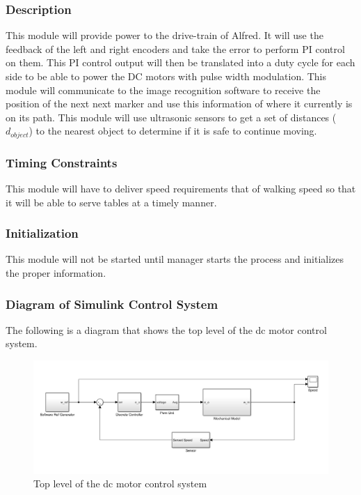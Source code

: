 \documentclass [10pt]{article}
\begin{document}

\subsubsection{Description}
This module will provide power to the drive-train of Alfred. It will use the feedback of the left and right encoders and take the error to perform PI control on them. This PI control output will then be translated into a duty cycle for each side to be able to power the DC motors with pulse width modulation. This module will communicate to the image recognition software to receive the position of the next next marker and use this information of where it currently is on its path. This module will use ultrasonic sensors to get a set of distances ($ d_{object} $) to the nearest object to determine if it is safe to continue moving.


\subsubsection{Timing Constraints}
This module will have to deliver speed requirements that of walking speed so that it will be able to serve tables at a timely manner.


\subsubsection{Initialization}
This module will not be started until manager starts the process and initializes the proper information.


\subsubsection{Diagram of Simulink Control System}
The following is a diagram that shows the top level of the dc motor control system. 
\begin{figure} [h!]
	\centering
	\includegraphics [scale = 0.4] {Figures/Simulink.png}
	\caption{Top level of the dc motor control system}
\end{figure}
\end{document}
